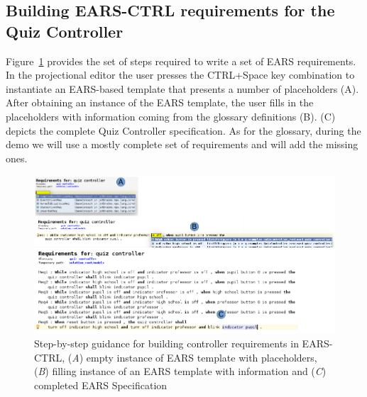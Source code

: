 \subsection{Building \textsf{EARS-CTRL} requirements for the Quiz Controller}
\vspace{-.2cm}
Figure~\ref{fig:EARS_req} provides the set of steps required to write a set of
EARS requirements. In the projectional editor the user presses the CTRL+Space
key combination to instantiate an EARS-based template that presents a number of
placeholders (A). After obtaining an instance of the EARS template, the user
fills in the placeholders with information coming from the glossary definitions
(B). (C) depicts the complete Quiz Controller specification. As for the
glossary, during the demo we will use a mostly complete set of requirements and
will add the missing ones.
\begin{figure}[!h]
\centering
\includegraphics[width=1.2\textwidth]{./images/Req_Spec_Steps.png}
\caption{Step-by-step guidance for building controller requirements in
\textsf{EARS-CTRL}, (\emph{A}) empty instance of EARS template with placeholders, (\emph{B}) filling instance
of an EARS template with information and (\emph{C}) completed EARS Specification}
\label{fig:EARS_req}
\vspace{-.4cm}
\end{figure}
\vspace{-.4cm}
